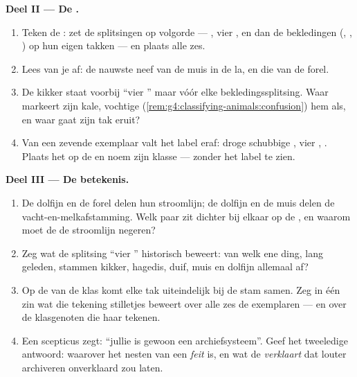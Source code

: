 \begin{problem}
\medskip\noindent\textbf{Deel II --- De .}
\begin{enumerate}[resume]
  \item Teken de : zet de splitsingen op volgorde ---
        , vier , en dan de bekledingen (,
        , ) op hun eigen takken --- en plaats alle zes.
  \item Lees van je  af: de nauwste neef van de muis in de la,
        en die van de forel.
  \item De kikker staat voorbij ``vier '' maar vóór elke
        bekledingssplitsing. Waar markeert zijn kale, vochtige 
        (\cref{rem:g4:classifying-animals:confusion}) hem als, en waar
        gaat zijn tak eruit?
  \item Van een zevende exemplaar valt het label eraf: droge schubbige
        , vier , . Plaats het op de  en
        noem zijn klasse --- zonder het label te zien.
\end{enumerate}

\medskip\noindent\textbf{Deel III --- De betekenis.}
\begin{enumerate}[resume]
  \item De dolfijn en de forel delen hun stroomlijn; de dolfijn en de
        muis delen de vacht-en-melkafstamming. Welk paar zit dichter bij
        elkaar op de , en waarom moet de  de stroomlijn
        negeren?
  \item Zeg wat de splitsing ``vier '' historisch beweert: van
        welk ene ding, lang geleden, stammen kikker, hagedis, duif, muis
        en dolfijn allemaal af?
  \item Op de  van de klas komt elke tak uiteindelijk bij de
        stam samen. Zeg in één zin wat die tekening stilletjes beweert
        over alle zes de exemplaren --- en over de klasgenoten die haar
        tekenen.
  \item Een scepticus zegt: ``jullie  is gewoon een
        archiefsysteem''. Geef het tweeledige antwoord: waarover het
        nesten van  een \emph{feit} is, en wat de 
        \emph{verklaart} dat louter archiveren onverklaard zou laten.
\end{enumerate}
\end{problem}
